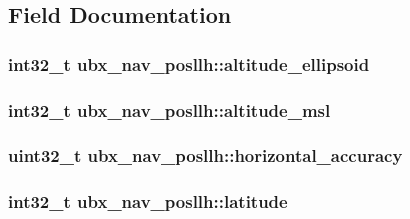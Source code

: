 \subsection{Field Documentation}
\hypertarget{structubx__nav__posllh_a6fb9625119ba9089ca95b991d3c172dd}{
\subsubsection[{altitude\+\_\+ellipsoid}]{\setlength{\rightskip}{0pt plus 5cm}int32\+\_\+t ubx\+\_\+nav\+\_\+posllh\+::altitude\+\_\+ellipsoid}}\label{structubx__nav__posllh_a6fb9625119ba9089ca95b991d3c172dd}
\hypertarget{structubx__nav__posllh_a1f5c943cfb736b62c872caf5e4ef1bfe}{
\subsubsection[{altitude\+\_\+msl}]{\setlength{\rightskip}{0pt plus 5cm}int32\+\_\+t ubx\+\_\+nav\+\_\+posllh\+::altitude\+\_\+msl}}\label{structubx__nav__posllh_a1f5c943cfb736b62c872caf5e4ef1bfe}
\hypertarget{structubx__nav__posllh_a85cb433495a6f5d814c3ca36136668f3}{
\subsubsection[{horizontal\+\_\+accuracy}]{\setlength{\rightskip}{0pt plus 5cm}uint32\+\_\+t ubx\+\_\+nav\+\_\+posllh\+::horizontal\+\_\+accuracy}}\label{structubx__nav__posllh_a85cb433495a6f5d814c3ca36136668f3}
\hypertarget{structubx__nav__posllh_a61002a3c8345cf72a1dcaa7ee986e99d}{
\subsubsection[{latitude}]{\setlength{\rightskip}{0pt plus 5cm}int32\+\_\+t ubx\+\_\+nav\+\_\+posllh\+::latitude}}\label{structubx__nav__posllh_a61002a3c8345cf72a1dcaa7ee986e99d}

